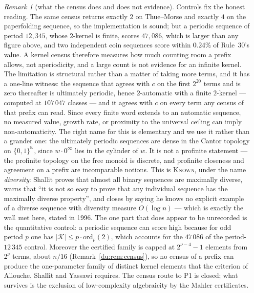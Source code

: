\documentclass[11pt]{article}
\theoremstyle{definition}
\theoremstyle{remark}
\newtheorem{remark}[theorem]{Remark}
\newcommand{\N}{\mathbb{N}}
\newcommand{\KNOWN}{\textsc{Known}}
\begin{document}
\begin{remark}[what the census does and does not evidence]\label{du:censuscaveat}Controls fix the honest reading. The same census returns exactly $2$ on Thue--Morse and exactly $4$ on the paperfolding sequence, so the implementation is sound; but a periodic sequence of period $12{,}345$, whose $2$-kernel is finite, scores $47{,}086$, which is larger than any figure above, and two independent coin sequences score within $0.24\%$ of Rule~30's value. A kernel census therefore measures how much counting room a prefix allows, not aperiodicity, and a large count is not evidence for an infinite kernel. The limitation is structural rather than a matter of taking more terms, and it has a one-line witness: the sequence that agrees with $c$ on the first $2^{20}$ terms and is zero thereafter is ultimately periodic, hence $2$-automatic with a finite $2$-kernel --- computed at $107\,047$ classes --- and it agrees with $c$ on every term any census of that prefix can read. Since every finite word extends to an automatic sequence, no measured value, growth rate, or proximity
to the universal ceiling can imply non-automaticity. The right name for this is elementary and we use
it rather than a grander one: the ultimately periodic sequences are dense in the Cantor topology on
$\{0,1\}^{\N}$, since $w\cdot0^{\infty}$ lies in the cylinder of $w$. It is not a profinite statement
--- the profinite topology on the free monoid is discrete, and profinite closeness and agreement on a
prefix are incomparable notions. This is \KNOWN, under the name \emph{diversity}: Shallit \cite{Shallit4} proves that almost all binary sequences are maximally diverse, warns that ``it is not so easy to prove that any individual sequence has the maximally diverse property'', and closes by saying he knows no explicit example of a diverse sequence with diversity measure $O(\log n)$ --- which is exactly the wall met here, stated in 1996. The one part that does appear to be unrecorded is the quantitative control: a periodic sequence can score high because for odd period $p$ one has $|\mathcal K|\le p\cdot\mathrm{ord}_p(2)$, which accounts for the $47\,086$ of the period-$12\,345$ control. Moreover the certified family is capped at $2^{\nu-4}-1$ elements from $2^{\nu}$ terms, about $n/16$ (Remark~\ref{du:rem:census}), so no census of a prefix can produce the one-parameter family of distinct kernel elements that the criterion of Allouche, Shallit and Yassawi requires. The census route to P1 is closed; what survives is the exclusion of low-complexity algebraicity by the Mahler certificates.\end{remark}
\end{document}
